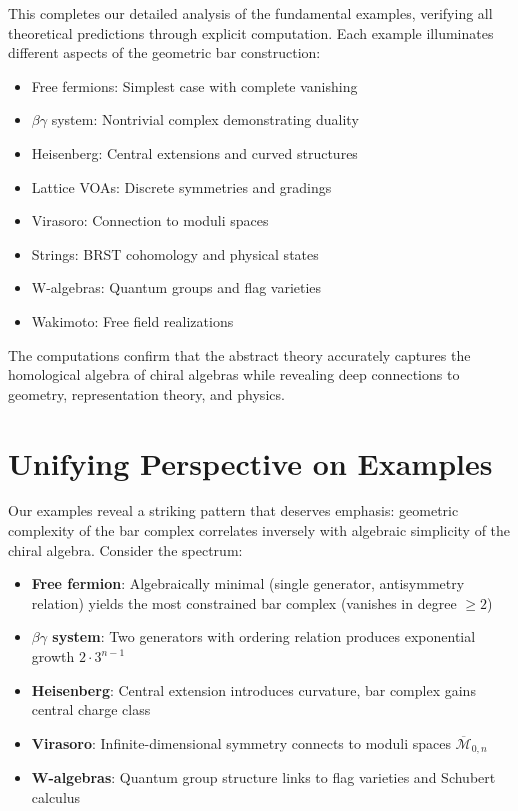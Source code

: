 This completes our detailed analysis of the fundamental examples, verifying all theoretical predictions 
through explicit computation. Each example illuminates different aspects of the geometric bar construction:
\begin{itemize}
\item Free fermions: Simplest case with complete vanishing
\item $\beta\gamma$ system: Nontrivial complex demonstrating duality
\item Heisenberg: Central extensions and curved structures
\item Lattice VOAs: Discrete symmetries and gradings
\item Virasoro: Connection to moduli spaces
\item Strings: BRST cohomology and physical states
\item W-algebras: Quantum groups and flag varieties
\item Wakimoto: Free field realizations
\end{itemize}
 
The computations confirm that the abstract theory accurately captures the homological algebra of chiral 
algebras while revealing deep connections to geometry, representation theory, and physics.
\section{Unifying Perspective on Examples}

Our examples reveal a striking pattern that deserves emphasis: geometric complexity of the bar complex correlates inversely with algebraic simplicity of the chiral algebra. Consider the spectrum:

\begin{itemize}
\item \textbf{Free fermion}: Algebraically minimal (single generator, antisymmetry relation) yields the most constrained bar complex (vanishes in degree $\geq 2$)
\item \textbf{$\beta\gamma$ system}: Two generators with ordering relation produces exponential growth $2 \cdot 3^{n-1}$
\item \textbf{Heisenberg}: Central extension introduces curvature, bar complex gains central charge class
\item \textbf{Virasoro}: Infinite-dimensional symmetry connects to moduli spaces $\overline{\mathcal{M}}_{0,n}$
\item \textbf{W-algebras}: Quantum group structure links to flag varieties and Schubert calculus
\end{itemize}

